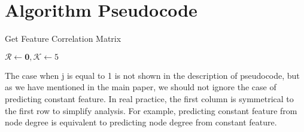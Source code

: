 \documentclass[runningheads]{llncs}
\begin{document}
\section{Algorithm Pseudocode}
\vspace{-1cm}
\begin{algorithm}[!htp]
  \caption{Get Feature Correlation Matrix}
  $\mathcal R \gets \textbf{0}, \mathcal K \gets 5$\\
  \end{algorithm}
\vspace{-0.8cm}
The case when j is equal to 1 is not shown in the description of pseudocode, but as we have mentioned in the main paper, we should not ignore the case of predicting constant feature. In real practice, the first column is symmetrical to the first row to simplify analysis. For example, predicting constant feature from node degree is equivalent to predicting node degree from constant feature.
\vspace{-0.5cm}
\end{document}
